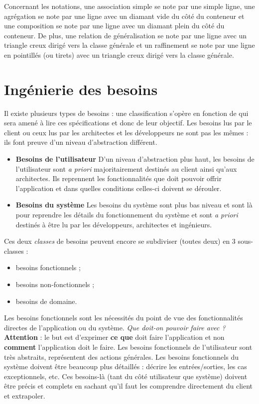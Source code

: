 \documentclass{article}
\begin{document}
			Concernant les notations, une association simple se note par une simple ligne, une agrégation se note par une ligne avec un diamant vide du côté du conteneur et une composition
			se note par une ligne avec un diamant plein du côté du conteneur. De plus, une relation de généralisation se note par une ligne avec un triangle creux dirigé vers la classe générale
			et un raffinement se note par une ligne en pointillés (ou tirets) avec un triangle creux dirigé vers la classe générale.

\section{Ingénierie des besoins}
	Il existe plusieurs types de besoins : une classification s'opère en fonction de qui sera amené à lire ces spécifications et donc de leur objectif. Les besoins lus par le client ou ceux
	lus par les architectes et les développeurs ne sont pas les mêmes : ils font preuve d'un niveau d'abstraction différent.
	
	\begin{itemize}
		\item \textbf{Besoins de l'utilisateur} D'un niveau d'abstraction plus haut, les besoins de l'utilisateur sont \textit{a priori} majoritairement destinés au client ainsi qu'aux architectes.
			Ils reprennent les fonctionnalités que doit pouvoir offrir l'application et dans quelles conditions celles-ci doivent se dérouler.
		\item \textbf{Besoins du système} Les besoins du système sont plus bas niveau et sont là pour reprendre les détails du fonctionnement du système et sont \textit{a priori} destinés à être
			lu par les développeurs, architectes et ingénieurs.
	\end{itemize}

	Ces deux \textit{classes} de besoins peuvent encore se subdiviser (toutes deux) en 3 sous-classes :

	\begin{itemize}
		\item besoins fonctionnels ;
		\item besoins non-fonctionnels ;
		\item besoins de domaine.
	\end{itemize}

	Les besoins fonctionnels sont les nécessités du point de vue des fonctionnalités directes de l'application ou du système. \textit{Que doit-on pouvoir faire avec ?} \textbf{Attention} : le
	but est d'exprimer \textbf{ce que} doit faire l'application et non \textbf{comment} l'application doit le faire. Les besoins fonctionnels de l'utilisateur sont très abstraits, représentent
	des actions générales. Les besoins fonctionnels du système doivent être beaucoup plus détaillés : décrire les entrées/sorties, les cas exceptionnels, etc. Ces besoins-là (tant du côté
	utilisateur que système) doivent être précis et complets en sachant qu'il faut les comprendre directement du client et extrapoler.
\end{document}
